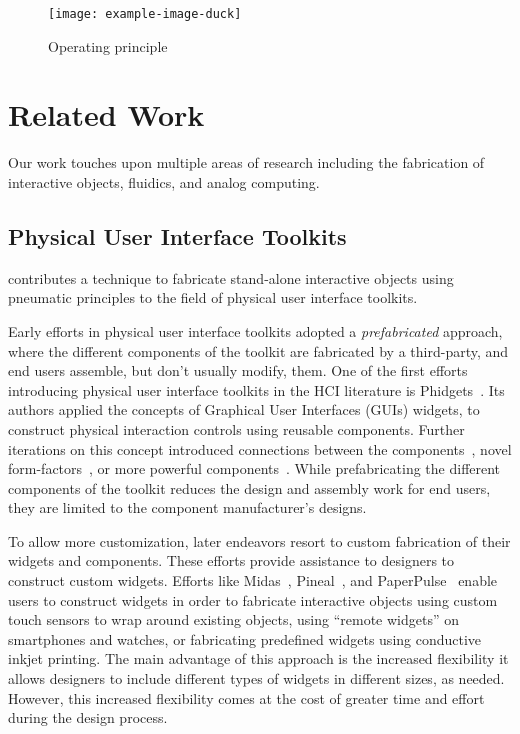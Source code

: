     \begin{figure}
      \centering
      \texttt{[image: example-image-duck]}
      \caption{Operating principle}
      \label{fig:app-slider}
    \end{figure}

  \section{Related Work}
    Our work touches upon multiple areas of research including the
    fabrication of interactive objects, fluidics, and analog computing.

      \subsection{Physical User Interface Toolkits}
        \al contributes a technique to fabricate stand-alone interactive
        objects using pneumatic principles to the field of physical user
        interface toolkits.

        Early efforts in physical user interface toolkits adopted a
        \emph{prefabricated} approach, where the different components of
        the toolkit are fabricated by a third-party, and end users
        assemble, but don't usually modify, them. One of the first efforts
        introducing physical user interface toolkits in the HCI literature
        is Phidgets~\cite{Greenberg:2001}. Its authors applied the concepts
        of Graphical User Interfaces (GUIs) widgets, to construct physical
        interaction controls using reusable components. Further iterations
        on this concept introduced connections between the
        components~\cite{Bdeir:2009}, novel
        form-factors~\cite{Hodges:2014}, or more powerful
        components~\cite{Villar:2012}. While prefabricating the different
        components of the toolkit reduces the design and assembly work for
        end users, they are limited to the component manufacturer's
        designs.
        
        To allow more customization, later endeavors resort to custom
        fabrication of their widgets and components. These efforts provide
        assistance to designers to construct custom widgets. Efforts like
        Midas~\cite{Savage:2012}, Pineal~\cite{Ledo:2017}, and
        PaperPulse~\cite{Ramakers:2015} enable users to construct widgets
        in order to fabricate interactive objects using custom touch
        sensors to wrap around existing objects, using ``remote widgets''
        on smartphones and watches, or fabricating predefined widgets using
        conductive inkjet printing. The main advantage of this approach is
        the increased flexibility it allows designers to
        include different types of widgets in different sizes,
        as needed. However, this increased flexibility comes at the cost of
        greater time and effort during the design process.

